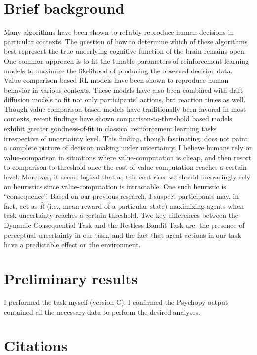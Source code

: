 \documentclass[11pt]{article}
\begin{document}
\section{Brief background}
\label{sec:orgb1ff173}
Many algorithms have been shown to reliably reproduce human decisions in particular contexts. The question of how to determine which of these algorithms best represent the true underlying cognitive function of the brain remains open. One common approach is to fit the tunable parameters of reinforcement learning models to maximize the likelihood of producing the observed decision data. Value-comparison based RL models have been shown to reproduce human behavior in various contexts. These models have also been combined with drift diffusion models to fit not only participants' actions, but reaction times as well\autocite{fontanesiReinforcementLearningDiffusion2019}. Though value-comparison based models have traditionally been favored in most contexts, recent findings have shown comparison-to-threshold based models exhibit greater goodness-of-fit in classical reinforcement learning tasks irrespective of uncertainty level\autocite{zidHumansForageReward2024}. This finding, though fascinating, does not paint a complete picture of decision making under uncertainty. I believe humans rely on value-comparison in situations where value-computation is cheap, and then resort to comparison-to-threshold once the cost of value-computation reaches a certain level. Moreover, it seems logical that as this cost rises we should increasingly rely on heuristics since value-computation is intractable. One such heuristic is ``consequence''. Based on our previous research, I suspect participants may, in fact, act as \(\bar{R}\) (i.e., mean reward of a particular state) maximizing agents when task uncertainty reaches a certain threshold\autocite{cecchiniConsequenceAssessmentBehavioral2023}. Two key differences between the Dynamic Consequential Task and the Restless Bandit Task are: the presence of perceptual uncertainty in our task, and the fact that agent actions in our task have a predictable effect on the environment.
\section{Preliminary results}
\label{sec:orgfb66c43}
I performed the task myself (version C). I confirmed the Psychopy output contained all the necessary data to perform the desired analyses.
\begin{center}

\end{center}
\section{Citations}
\label{sec:org9d1f88b}
\printbibliography
\end{document}
